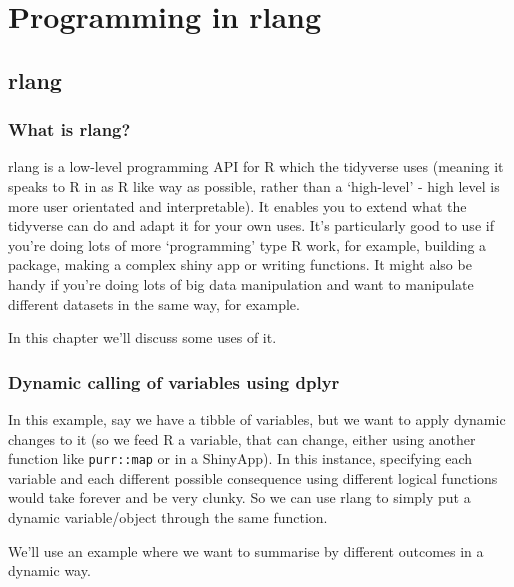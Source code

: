 \documentclass[
]{book}
\begin{document}
\hypertarget{programming-in-rlang}{%
\chapter{Programming in rlang}\label{programming-in-rlang}}

\hypertarget{rlang}{%
\section{rlang}\label{rlang}}

\hypertarget{what-is-rlang}{%
\subsection{What is rlang?}\label{what-is-rlang}}

rlang is a low-level programming API for R which the tidyverse uses (meaning it speaks to R in as R like way as possible, rather than a `high-level' - high level is more user orientated and interpretable). It enables you to extend what the tidyverse can do and adapt it for your own uses. It's particularly good to use if you're doing lots of more `programming' type R work, for example, building a package, making a complex shiny app or writing functions. It might also be handy if you're doing lots of big data manipulation and want to manipulate different datasets in the same way, for example.

In this chapter we'll discuss some uses of it.

\hypertarget{dynamic-calling-of-variables-using-dplyr}{%
\subsection{Dynamic calling of variables using dplyr}\label{dynamic-calling-of-variables-using-dplyr}}

In this example, say we have a tibble of variables, but we want to apply dynamic changes to it (so we feed R a variable, that can change, either using another function like \texttt{purr::map} or in a ShinyApp). In this instance, specifying each variable and each different possible consequence using different logical functions would take forever and be very clunky. So we can use rlang to simply put a dynamic variable/object through the same function.

We'll use an example where we want to summarise by different outcomes in a dynamic way.
\end{document}
